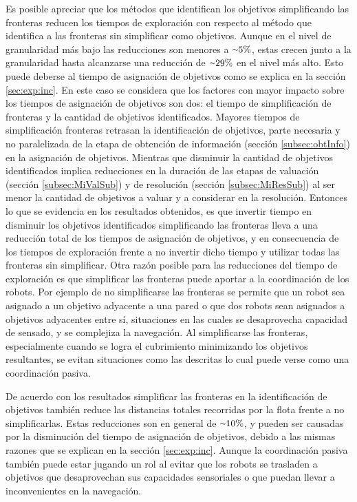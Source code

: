 Es posible apreciar que los métodos que identifican los objetivos simplificando
las fronteras reducen los tiempos de exploración con respecto al método que
identifica a las fronteras sin simplificar como objetivos. Aunque en el nivel
de granularidad más bajo las reducciones son menores a ${\smallsim}5\%$, estas crecen junto
a la granularidad hasta alcanzarse una reducción de ${\smallsim}29\%$ en el
nivel más alto. Esto puede deberse al tiempo de asignación de objetivos como se
explica en la sección \ref{sec:exp:inc}. En este caso se considera que los
factores con mayor impacto sobre los tiempos de asignación de objetivos son dos:
el tiempo de simplificación de fronteras y la cantidad de objetivos
identificados. Mayores tiempos de simplificación fronteras retrasan la
identificación de objetivos, parte necesaria y no paralelizada de la etapa de
obtención de información (sección \ref{subsec:obtInfo}) en la asignación de
objetivos. Mientras que disminuir la cantidad de objetivos identificados implica
reducciones en la duración de las etapas de valuación (sección
\ref{subsec:MiValSub}) y de resolución (sección \ref{subsec:MiResSub}) al ser
menor la cantidad de objetivos a valuar y a considerar en la resolución. Entonces lo que se evidencia
en los resultados obtenidos, es que invertir tiempo en disminuir los objetivos
identificados simplificando las fronteras lleva a una reducción total de los
tiempos de asignación de objetivos, y en consecuencia de los tiempos de exploración
frente a no invertir dicho tiempo y utilizar todas las fronteras sin
simplificar. Otra razón posible para las reducciones del tiempo de exploración
es que simplificar las fronteras puede aportar a la coordinación de los robots.
Por ejemplo de no simplificarse las fronteras se permite que un robot sea
asignado a un objetivo adyacente a una pared o que dos robots sean asignados a
objetivos adyacentes entre sí, situaciones en las cuales se desaprovecha
capacidad de sensado, y se complejiza la navegación. Al simplificarse las
fronteras, especialmente cuando se logra el cubrimiento minimizando los
objetivos resultantes, se evitan situaciones como las descritas lo cual puede
verse como una coordinación pasiva. %

De acuerdo con los resultados simplificar las fronteras en la identificación de
objetivos también reduce las distancias totales recorridas por la flota frente
a no simplificarlas. Estas reducciones son en general de ${\smallsim}10\%$, y
pueden ser causadas por la disminución del tiempo de asignación de objetivos,
debido a las mismas razones que se explican en la sección \ref{sec:exp:inc}.
Aunque la coordinación pasiva también puede estar jugando un rol al evitar que
los robots se trasladen a objetivos que desaprovechan sus capacidades
sensoriales o que puedan llevar a inconvenientes en la navegación.

